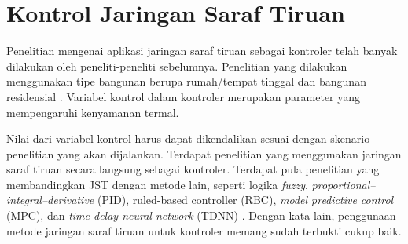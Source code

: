 \section{Kontrol Jaringan Saraf Tiruan}

Penelitian mengenai aplikasi jaringan saraf tiruan sebagai kontroler telah banyak dilakukan oleh peneliti-peneliti sebelumnya. Penelitian yang dilakukan menggunakan tipe bangunan berupa rumah/tempat tinggal \cite{paper22JJkim}\cite{paper22SKJung} dan bangunan residensial \cite{paper22JanDrgona}. Variabel kontrol dalam kontroler merupakan parameter yang mempengaruhi kenyamanan termal.

Nilai dari variabel kontrol harus dapat dikendalikan sesuai dengan skenario penelitian yang akan dijalankan. Terdapat penelitian yang menggunakan jaringan saraf tiruan secara langsung sebagai kontroler. Terdapat pula penelitian yang membandingkan JST dengan metode lain, seperti logika \textit{fuzzy}, \textit{proportional–integral–derivative} (PID), ruled-based controller (RBC), \textit{model predictive control} (MPC), dan \textit{time delay neural network} (TDNN) \cite{paper22JanDrgona}. Dengan kata lain, penggunaan metode jaringan saraf tiruan untuk kontroler memang sudah terbukti cukup baik.


